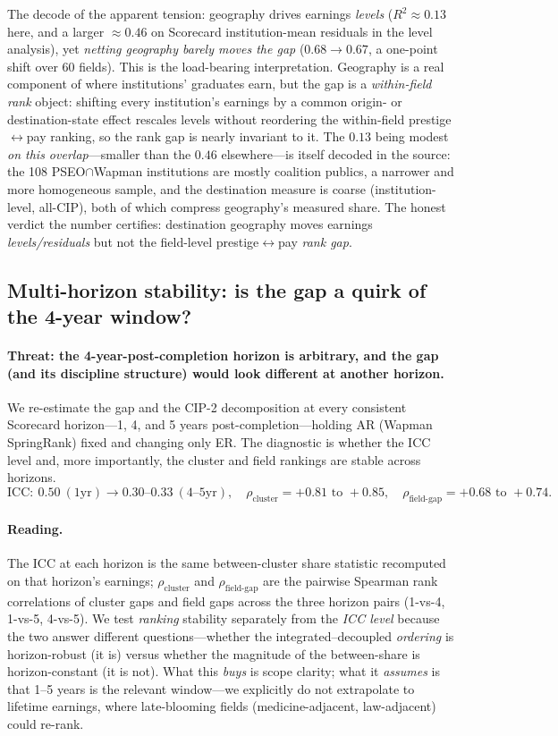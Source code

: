 \documentclass[11pt]{article}
\begin{document}
The decode of the apparent tension: geography drives earnings \emph{levels} ($R^2\approx0.13$ here, and a larger $\approx0.46$ on Scorecard institution-mean residuals in the level analysis), yet \emph{netting geography barely moves the gap} ($0.68\to0.67$, a one-point shift over 60 fields). This is the load-bearing interpretation. Geography is a real component of where institutions' graduates earn, but the gap is a \emph{within-field rank} object: shifting every institution's earnings by a common origin- or destination-state effect rescales levels without reordering the within-field prestige$\leftrightarrow$pay ranking, so the rank gap is nearly invariant to it. The $0.13$ being modest \emph{on this overlap}---smaller than the $0.46$ elsewhere---is itself decoded in the source: the 108 PSEO$\cap$Wapman institutions are mostly coalition publics, a narrower and more homogeneous sample, and the destination measure is coarse (institution-level, all-CIP), both of which compress geography's measured share. The honest verdict the number certifies: destination geography moves earnings \emph{levels/residuals} but not the field-level prestige$\leftrightarrow$pay \emph{rank gap}.

\subsection{Multi-horizon stability: is the gap a quirk of the 4-year window?}

\paragraph{Threat: the 4-year-post-completion horizon is arbitrary, and the gap (and its discipline structure) would look different at another horizon.}
We re-estimate the gap and the CIP-2 decomposition at every consistent Scorecard horizon---1, 4, and 5 years post-completion---holding AR (Wapman SpringRank) fixed and changing only ER. The diagnostic is whether the ICC level and, more importantly, the cluster and field rankings are stable across horizons.
\[
\mathrm{ICC}:\ 0.50\ (\text{1yr}) \to 0.30\text{--}0.33\ (\text{4--5yr}),\quad
\rho_{\text{cluster}}=+0.81\text{ to }+0.85,\quad
\rho_{\text{field-gap}}=+0.68\text{ to }+0.74 .
\]

\paragraph{Reading.} The ICC at each horizon is the same between-cluster share statistic recomputed on that horizon's earnings; $\rho_{\text{cluster}}$ and $\rho_{\text{field-gap}}$ are the pairwise Spearman rank correlations of cluster gaps and field gaps across the three horizon pairs (1-vs-4, 1-vs-5, 4-vs-5). We test \emph{ranking} stability separately from the \emph{ICC level} because the two answer different questions---whether the integrated--decoupled \emph{ordering} is horizon-robust (it is) versus whether the magnitude of the between-share is horizon-constant (it is not). What this \emph{buys} is scope clarity; what it \emph{assumes} is that 1--5 years is the relevant window---we explicitly do not extrapolate to lifetime earnings, where late-blooming fields (medicine-adjacent, law-adjacent) could re-rank.
\end{document}
